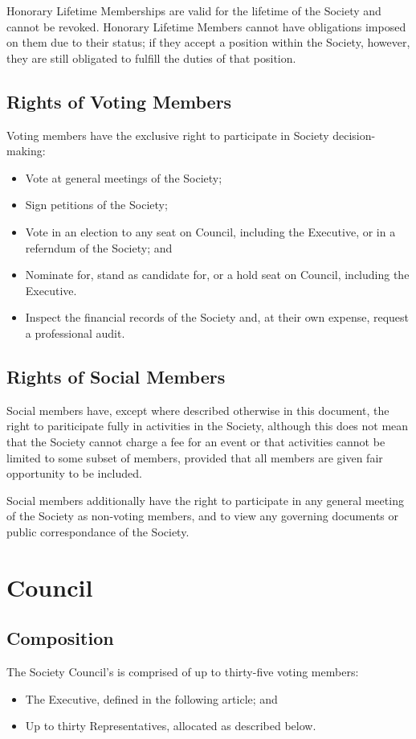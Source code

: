 Honorary Lifetime Memberships are valid for the lifetime of the Society and
cannot be revoked. Honorary Lifetime Members cannot have obligations imposed on
them due to their status; if they accept a position within the Society, however,
they are still obligated to fulfill the duties of that position.

\subsection{Rights of Voting Members}
Voting members have the exclusive right to participate in Society
decision-making:
\begin{itemize}
  \item Vote at general meetings of the Society;
  \item Sign petitions of the Society;
  \item Vote in an election to any seat on Council, including the Executive, or
    in a referndum of the Society; and
  \item Nominate for, stand as candidate for, or a hold seat on Council,
    including the Executive.
  \item Inspect the financial records of the Society and, at their own expense,
    request a professional audit.
\end{itemize}

\subsection{Rights of Social Members}
Social members have, except where described otherwise in this document, the
right to pariticipate fully in activities in the Society, although this does not
mean that the Society cannot charge a fee for an event or that activities cannot
be limited to some subset of members, provided that all members are given fair
opportunity to be included.

Social members additionally have the right to participate in any general meeting
of the Society as non-voting members, and to view any governing documents or
public correspondance of the Society.

\section{Council}
\subsection{Composition}
The Society Council's is comprised of up to thirty-five voting members:
\begin{itemize}
  \item The Executive, defined in the following article; and
  \item Up to thirty Representatives, allocated as described below.
\end{itemize}

